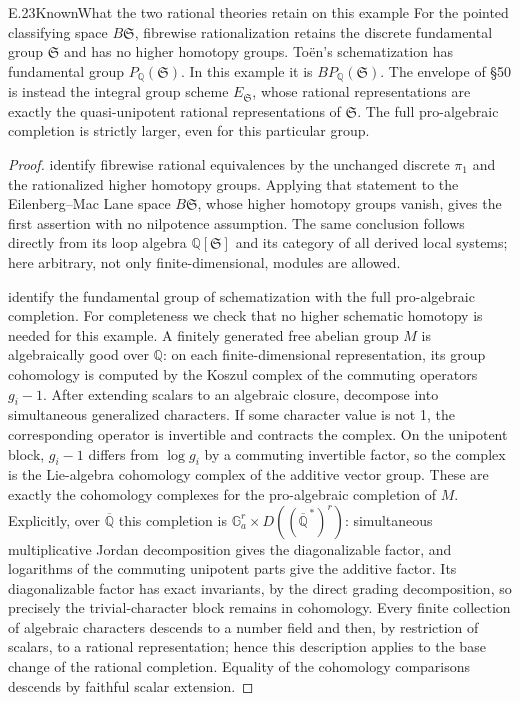 \begin{statement}{E.23}{Known}{What the two rational theories retain on this example}
For the pointed classifying space \(B\mathfrak S\), fibrewise
rationalization retains the discrete fundamental group
\(\mathfrak S\) and has no higher homotopy groups.  To\"en's
schematization has fundamental group
\(P_{\mathbb Q}(\mathfrak S)\).  In this example it is
\(BP_{\mathbb Q}(\mathfrak S)\).  The envelope of \S50 is instead
the integral group scheme \(E_{\mathfrak S}\), whose rational
representations are exactly the quasi-unipotent rational
representations of \(\mathfrak S\).  The full pro-algebraic
completion is strictly larger, even for this particular group.
\end{statement}
\begin{proof}
\citet[Theorem~3; repeated as Theorem~16]{E_Rivera2021} identify fibrewise rational
equivalences by the unchanged discrete \(\pi_1\) and the
rationalized higher homotopy groups.  Applying that statement
to the Eilenberg--Mac Lane space \(B\mathfrak S\), whose higher
homotopy groups vanish, gives the first assertion with no
nilpotence assumption.  The same conclusion follows directly
from its loop algebra \(\mathbb Q[\mathfrak S]\) and its
category of all derived local systems; here arbitrary, not
only finite-dimensional, modules are allowed.

\citet[Corollary~3.3.7]{E_Toen2006} identify the fundamental
group of schematization with the full pro-algebraic completion.
For completeness we check that no higher schematic homotopy
is needed for this example.  A finitely generated free abelian
group \(M\) is algebraically good over \(\mathbb Q\): on each
finite-dimensional representation, its group cohomology is
computed by the Koszul complex of the commuting operators
\(g_i-1\).  After extending scalars to an algebraic closure,
decompose into simultaneous generalized characters.  If some
character value is not 1, the corresponding operator is
invertible and contracts the complex.  On the unipotent block,
\(g_i-1\) differs from \(\log g_i\) by a commuting invertible
factor, so the complex is the Lie-algebra cohomology complex
of the additive vector group.  These are exactly the
cohomology complexes for the pro-algebraic completion of
\(M\).  Explicitly, over \(\overline{\mathbb Q}\) this completion
is \(\mathbb G_a^r\times D((\overline{\mathbb Q}^{\,*})^r)\):
simultaneous multiplicative Jordan decomposition gives the
diagonalizable factor, and logarithms of the commuting
unipotent parts give the additive factor.  Its diagonalizable
factor has exact invariants, by the direct grading decomposition,
so precisely the trivial-character block remains in cohomology.
Every finite collection of algebraic characters descends to a
number field and then, by restriction of scalars, to a rational
representation; hence this description applies to the base
change of the rational completion.  Equality of the cohomology
comparisons descends by faithful scalar extension.


\end{proof}
